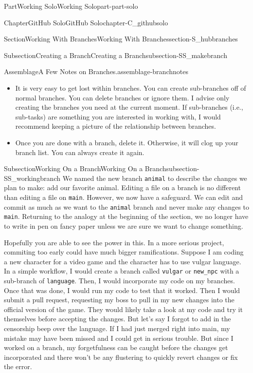 \documentclass[twoside,10pt,]{book}
\newcommand{\mono}[1]{\texttt{#1}}
\begin{document}
\begin{partptx}{Part}{Working Solo}{}{Working Solo}{}{}{part-part-solo}
\begin{chapterptx}{Chapter}{GitHub Solo}{}{GitHub Solo}{}{}{chapter-C_githubsolo}
\begin{sectionptx}{Section}{Working With Branches}{}{Working With Branches}{}{}{section-S_hubbranches}
\begin{subsectionptx}{Subsection}{Creating a Branch}{}{Creating a Branch}{}{}{subsection-SS_makebranch}
\begin{assemblage}{Assemblage}{A Few Notes on Branches.}{assemblage-branchnotes}
\begin{itemize}[label=\textbullet]
\item{}It is very easy to get lost within branches. You can create sub-branches off of normal branches. You can delete branches or ignore them. I advise only creating the branches you need at the current moment. If sub-branches (i.e., sub-tasks) are something you are interested in working with, I would recommend keeping a picture of the relationship between branches.%
\item{}Once you are done with a branch, delete it. Otherwise, it will clog up your branch list. You can always create it again.%
\end{itemize}
%
\end{assemblage}
\end{subsectionptx}
%
%
\typeout{************************************************}
\typeout{************************************************}
%
\begin{subsectionptx}{Subsection}{Working On a Branch}{}{Working On a Branch}{}{}{subsection-SS_workingbranch}
%
We named the new branch \mono{animal} to describe the changes we plan to make: add our favorite animal. Editing a file on a branch is no different than editing a file on \mono{main}. However, we now have a safeguard. We can edit and commit as much as we want to the \mono{animal} branch and never make any changes to \mono{main}. Returning to the analogy at the beginning of the section, we no longer have to write in pen on fancy paper unless we are sure we want to change something.%
\par
Hopefully you are able to see the power in this. In a more serious project, commiting too early could have much bigger ramifications. Suppose I am coding a new character for a video game and the character has to use vulgar language. In a simple workflow, I would create a branch called \mono{vulgar} or \mono{new\_npc} with a sub-branch of \mono{language}. Then, I would incorporate my code on my branches. Once that was done, I would run my code to test that it worked. Then I would submit a pull request, requesting my boss to pull in my new changes into the official version of the game. They would likely take a look at my code and try it themselves before accepting the changes. But let's say I forgot to add in the censorship beep over the language. If I had just merged right into main, my mistake may have been missed and I could get in serious trouble. But since I worked on a branch, my forgetfulness can be caught before the changes get incorporated and there won't be any flustering to quickly revert changes or fix the error.%

\end{subsectionptx}
\end{sectionptx}
\end{chapterptx}
\end{partptx}
\end{document}
